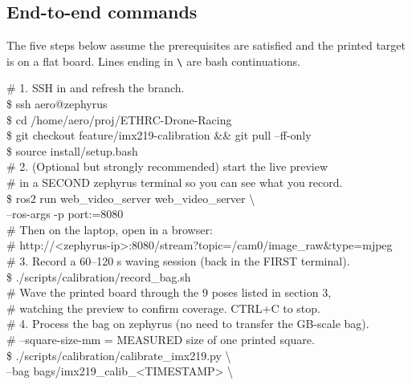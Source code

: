\documentclass[11pt,a4paper]{article}
\begin{document}
\subsection{End-to-end commands}
\nopagebreak

The five steps below assume the prerequisites are satisfied and the printed target is on a flat board. Lines ending in \texttt{\textbackslash{}} are bash continuations.
\nopagebreak

\begin{codebox}
\textcolor{ethMuted}{\# 1. SSH in and refresh the branch.}\\
\$ ssh aero@zephyrus\\
\$ cd /home/aero/proj/ETHRC-Drone-Racing\\
\$ git checkout feature/imx219-calibration \&\& git pull --ff-only\\
\$ source install/setup.bash\\[6pt]
\textcolor{ethMuted}{\# 2. (Optional but strongly recommended) start the live preview}\\
\textcolor{ethMuted}{\#    in a SECOND zephyrus terminal so you can see what you record.}\\
\$ ros2 run web\_video\_server web\_video\_server \textbackslash{}\\
\quad   --ros-args -p port:=8080\\
\textcolor{ethMuted}{\#    Then on the laptop, open in a browser:}\\
\textcolor{ethMuted}{\#    http://<zephyrus-ip>:8080/stream?topic=/cam0/image\_raw\&type=mjpeg}\\[6pt]
\textcolor{ethMuted}{\# 3. Record a 60--120 s waving session (back in the FIRST terminal).}\\
\$ ./scripts/calibration/record\_bag.sh\\
\textcolor{ethMuted}{\#    Wave the printed board through the 9 poses listed in section 3,}\\
\textcolor{ethMuted}{\#    watching the preview to confirm coverage. CTRL+C to stop.}\\[6pt]
\textcolor{ethMuted}{\# 4. Process the bag on zephyrus (no need to transfer the GB-scale bag).}\\
\textcolor{ethMuted}{\#    --square-size-mm = MEASURED size of one printed square.}\\
\$ ./scripts/calibration/calibrate\_imx219.py \textbackslash{}\\
\quad   --bag bags/imx219\_calib\_<TIMESTAMP> \textbackslash{}\\

\end{codebox}
\end{document}
